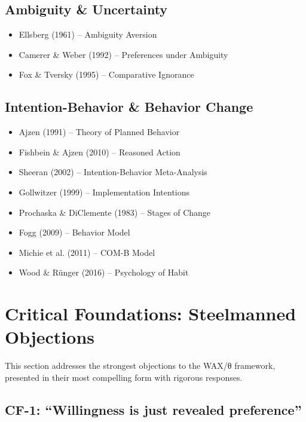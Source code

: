 \subsection{Ambiguity \& Uncertainty}
\begin{itemize}
\item Ellsberg (1961) -- Ambiguity Aversion
\item Camerer \& Weber (1992) -- Preferences under Ambiguity
\item Fox \& Tversky (1995) -- Comparative Ignorance
\end{itemize}

\subsection{Intention-Behavior \& Behavior Change}
\begin{itemize}
\item Ajzen (1991) -- Theory of Planned Behavior
\item Fishbein \& Ajzen (2010) -- Reasoned Action
\item Sheeran (2002) -- Intention-Behavior Meta-Analysis
\item Gollwitzer (1999) -- Implementation Intentions
\item Prochaska \& DiClemente (1983) -- Stages of Change
\item Fogg (2009) -- Behavior Model
\item Michie et al. (2011) -- COM-B Model
\item Wood \& Rünger (2016) -- Psychology of Habit
\end{itemize}


\section{Critical Foundations: Steelmanned Objections}
\label{sec:av-critical-foundations}

This section addresses the strongest objections to the WAX/θ framework, presented in their most compelling form with rigorous responses.

\subsection{CF-1: ``Willingness is just revealed preference''}

